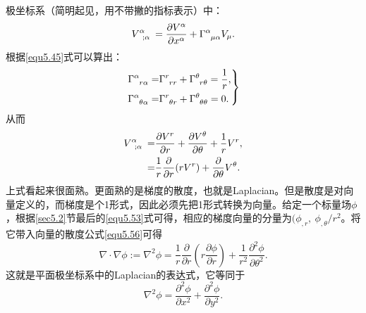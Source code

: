 极坐标系（简明起见，用不带撇的指标表示）中：
\begin{equation*}
    V\indices{^\alpha_{; \alpha}} = \frac{\partial V^\alpha}{\partial x^\alpha} + \Gamma\indices{^\alpha_{\mu \alpha}} V_{\mu}.
\end{equation*}
根据\eqref{equ5.45}式可以算出：
\begin{equation}
\left.
\begin{split}
    \Gamma\indices{^\alpha_{r \alpha}} =& \Gamma\indices{^r_{rr}} + \Gamma\indices{^\theta_{r \theta}} = \frac{1}{r}, \\
    \Gamma\indices{^\alpha_{\theta \alpha}} =& \Gamma\indices{^r_{\theta r}} + \Gamma\indices{^\theta_{\theta \theta}} = 0.
\end{split}
\right\}
\label{equ5.55}
\end{equation}
从而
\begin{align}
    V\indices{^\alpha_{; \alpha}} =& \frac{\partial V^r}{\partial r} + \frac{\partial V^\theta}{\partial \theta} + \frac{1}{r} V^r, \notag \\
    =& \frac{1}{r} \frac{\partial}{\partial r} (r V^r) + \frac{\partial}{\partial \theta} V^\theta. \label{equ5.56}
\end{align}
上式看起来很面熟。更面熟的是梯度的散度，也就是Laplacian。但是散度是对向量定义的，而梯度是个1形式，因此必须先把1形式转换为向量。给定一个标量场$\phi$，根据\ref{sec5.2}节最后的\eqref{equ5.53}式可得，相应的梯度向量的分量为$(\phi_{, r},\ \phi_{, \theta} / r^2$。将它带入向量的散度公式\eqref{equ5.56}可得
\begin{equation}
    \nabla \cdot \nabla \phi := \nabla^2 \phi = \frac{1}{r} \frac{\partial}{\partial r} \left( r \frac{\partial \phi}{\partial r} \right) + \frac{1}{r^2} \frac{\partial^2 \phi}{\partial \theta^2}.
\label{equ5.57}
\end{equation}
这就是平面极坐标系中的Laplacian的表达式，它等同于
\begin{equation}
    \nabla^2 \phi = \frac{\partial^2 \phi}{\partial x^2} + \frac{\partial^2 \phi}{\partial y^2}.
\label{equ5.58}
\end{equation}



